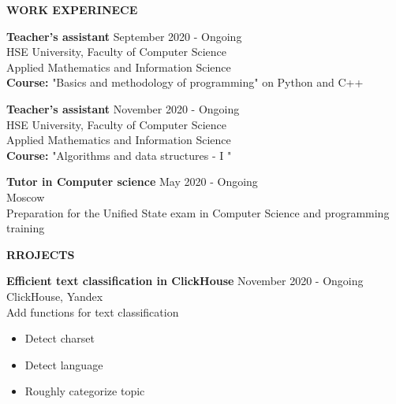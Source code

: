 \documentclass[12pt]{article}
\begin{document}
\begin{center}
	{\noindent \bfseries WORK EXPERINECE}
\end{center} 

\vspace{4pt} %

\noindent
{\bfseries Teacher's assistant} \hfill September 2020 - Ongoing \\ 
\noindent HSE University, Faculty of Computer Science \hfill  \\ 
\noindent  Applied Mathematics and Information Science\\  
{\bfseries Course:} "Basics and methodology of programming" on Python and C++


\vspace{0.2in} %

\noindent
{\bfseries Teacher's assistant} \hfill November 2020 - Ongoing \\ 
\noindent HSE University, Faculty of Computer Science \hfill  \\ 
\noindent  Applied Mathematics and Information Science\\  
{\bfseries Course:} "Algorithms and data structures - I "
\vspace{0.2in} %

\noindent
{\bfseries Tutor in Computer science} \hfill May 2020 - Ongoing \\ 
\noindent Moscow \hfill  \\ 
\noindent  Preparation for the Unified State exam in Computer Science and programming training
\\

\begin{center}
	{\noindent \bfseries RROJECTS}
\end{center}

\vspace{4pt} %

\noindent
{\bfseries Efficient text classification in ClickHouse} \hfill November 2020 - Ongoing \\ 
\noindent ClickHouse, Yandex \\ Add functions for text classification \hfill

\begin{itemize} \itemsep -2pt %
	\item Detect charset
	\item Detect language
	\item Roughly categorize topic
\end{itemize}
\pagestyle{empty}
\end{document}
